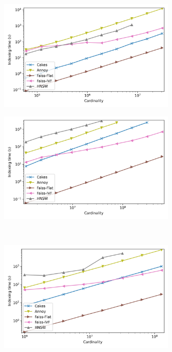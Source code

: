 \begin{figure}
    \begin{subfigure}[b]{0.47\textwidth}
    \includegraphics[width=0.95\textwidth]{plots/fashion-mnist-indexing.png}\\
    \label{fig:results:fashion-mnist-indexing}
    \end{subfigure}%
    \begin{subfigure}[b]{0.47\textwidth}
    \includegraphics[width=0.95\textwidth]{plots/glove-25-indexing.png}\\
    \label{fig:results:glove-25-indexing}
    \end{subfigure}
    \vspace{1em}
    \\
    \begin{subfigure}[b]{0.47\textwidth}
    \includegraphics[width=0.95\textwidth]{plots/sift-indexing.png}\\

\end{subfigure}
\end{figure}
